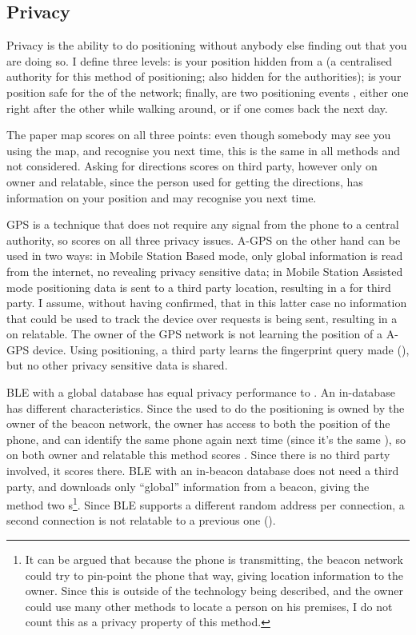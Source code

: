 \subsection{Privacy}
Privacy is the ability to do positioning without anybody else finding out that you are doing so.
I define three levels: is your position hidden from a  (a centralised authority for this method of positioning; also hidden for the authorities); is your position safe for the  of the network; finally, are two positioning events , either one right after the other while walking around, or if one comes back the next day.

The paper map scores \yes on all three points: even though somebody may see you using the map, and recognise you next time, this is the same in all methods and not considered.
Asking for directions scores \yes on third party, however only \maybe on owner and relatable, since the person used for getting the directions, has information on your position and may recognise you next time.

GPS is a technique that does not require any signal from the phone to a central authority, so scores \yes on all three privacy issues.
A-GPS on the other hand can be used in two ways: in Mobile Station Based mode, only global information is read from the internet, no revealing privacy sensitive data; in Mobile Station Assisted mode positioning data is sent to a third party location, resulting in a \maybe for third party.
I assume, without having confirmed, that in this latter case no information that could be used to track the device over requests is being sent, resulting in a \yes on relatable.
The owner of the GPS network is not learning the position of a A-GPS device.
Using \wifi positioning, a third party learns the fingerprint query made (\no), but no other privacy sensitive data is shared.

BLE with a global database has equal privacy performance to \wifi.
An in-\app database has different characteristics.
Since the \app used to do the positioning is owned by the owner of the beacon network, the owner has access to both the position of the phone, and can identify the same phone again next time (since it's the same \app), so on both owner and relatable this method scores \no.
Since there is no third party involved, it scores \yes there.
BLE with an in-beacon database does not need a third party, and downloads only ``global'' information from a beacon, giving the method two \yes s\footnote{It can be argued that because the phone is transmitting, the beacon network could try to pin-point the phone that way, giving location information to the owner. Since this is outside of the technology being described, and the owner could use many other methods to locate a person on his premises, I do not count this as a privacy property of this method.}.
Since BLE supports a different random address per connection, a second connection is not relatable to a previous one (\yes).

